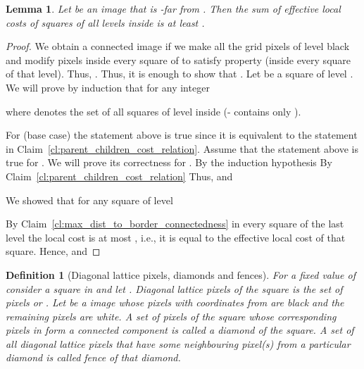 \documentclass[11pt,english]{article}
\newtheorem{lemma}[theorem]{Lemma}
\newtheorem{definition}{Definition}[section]
\numberwithin{figure}{section}
\begin{document}
\begin{lemma}
\label{lm:sum_of_local_costs}
Let  be an  image that is -far from . Then the sum of
effective local costs of squares of all levels inside  is at least .
\end{lemma}
\begin{proof}
We obtain a connected image if we make all the grid pixels of level  black and modify pixels inside every square of  to satisfy property 
 (inside every square of that level).
Thus, . Thus,
it is enough to show that
. Let  be a square of level . We will prove by induction that for any integer 


 where
 denotes the set of all
squares of level  inside  (- contains
only ).

For  (base case) the statement above is true since it is equivalent to the
statement in Claim~\ref{cl:parent_children_cost_relation}. Assume
that the statement above is true for . We will prove its correctness for
.
By the induction hypothesis 
By Claim~\ref{cl:parent_children_cost_relation}
 Thus,
 and


We showed that for any square  of level 

By Claim~\ref{cl:max_dist_to_border_connectedness} in every square of the last
level the local cost is at most , i.e., it is equal to the effective local cost of that square. Hence,
 and

\end{proof}

\begin{definition}[Diagonal lattice pixels, diamonds and fences]
\label{def:diagonal_lattice_pixels_and_regions}
For a fixed value of  consider a square in  and let
. \emph{Diagonal lattice pixels} of
the square is the set of pixels  or . Let
 be a  image whose pixels with coordinates from  are black and the remaining pixels are white.
A set of pixels of the square whose corresponding pixels
in  form a connected component is called a \emph{diamond} of the square.
A set of all diagonal lattice pixels that have some neighbouring
pixel(s) from a particular diamond is called \emph{fence} of that diamond.
\end{definition}
\end{document}
